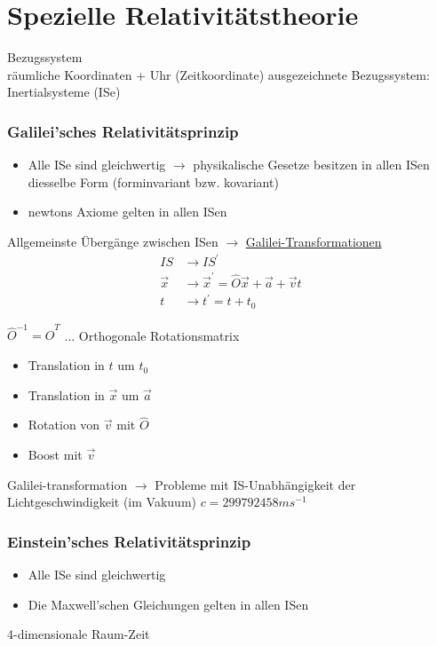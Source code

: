 \documentclass[a4paper, 11pt]{article}
\numberwithin{equation}{section}
\begin{document}
\newpage
\section{Spezielle Relativitätstheorie}
Bezugssystem\\
räumliche Koordinaten + Uhr (Zeitkoordinate)
ausgezeichnete Bezugssystem: Inertialsysteme (ISe)


\subsubsection*{Galilei'sches Relativitätsprinzip}
\renewcommand{\labelitemi}{-}
\begin{itemize}
\item Alle ISe sind gleichwertig $\rightarrow$ physikalische Gesetze besitzen in allen ISen diesselbe Form (forminvariant bzw. kovariant)
\item newtons Axiome gelten in allen ISen
\end{itemize}
Allgemeinste Übergänge zwischen ISen $\rightarrow$ \underline{Galilei-Transformationen}
\begin{equation}
\begin{aligned}
IS &\rightarrow IS^\prime \\
\vec{x} &\rightarrow \vec{x}^\prime = \hat{O} \vec{x} + \vec{a} + \vec{v}t \\
t &\rightarrow t^\prime = t + t_0
\end{aligned}
\end{equation}


$\hat{O}^{-1} =  \hat{O}^T$ ... Orthogonale Rotationsmatrix

\renewcommand{\labelitemi}{$\bullet$}
\begin{itemize}
\item Translation in $t$ um $t_0$
\item Translation in $\vec{x}$ um $\vec{a}$
\item Rotation von $\vec{v}$ mit $\hat{O}$
\item Boost mit $\vec{v}$
\end{itemize}

Galilei-transformation $\rightarrow$ Probleme mit IS-Unabhängigkeit der \\ Lichtgeschwindigkeit (im Vakuum)
$c = 299792458 m s^{-1}$

\subsubsection*{Einstein'sches Relativitätsprinzip}
\renewcommand{\labelitemi}{-}
\begin{itemize}
\item Alle ISe sind gleichwertig
\item Die Maxwell'schen Gleichungen gelten in allen ISen
\end{itemize}
4-dimensionale Raum-Zeit
\end{document}
